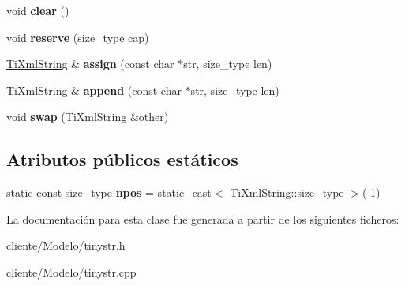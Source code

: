 \begin{DoxyCompactItemize}
\item 
\hypertarget{classTiXmlString_ab20e06e4c666abf3bdbfb3a1191d4888}{void {\bfseries clear} ()}\label{classTiXmlString_ab20e06e4c666abf3bdbfb3a1191d4888}

\item 
\hypertarget{classTiXmlString_a88ecf9f0f00cb5c67b6b637958d7049c}{void {\bfseries reserve} (size\-\_\-type cap)}\label{classTiXmlString_a88ecf9f0f00cb5c67b6b637958d7049c}

\item 
\hypertarget{classTiXmlString_ac72f3d9149b7812c1e6c59402014d0d5}{\hyperlink{classTiXmlString}{\-Ti\-Xml\-String} \& {\bfseries assign} (const char $\ast$str, size\-\_\-type len)}\label{classTiXmlString_ac72f3d9149b7812c1e6c59402014d0d5}

\item 
\hypertarget{classTiXmlString_ad44b21700d2ec24a511367b222b643fb}{\hyperlink{classTiXmlString}{\-Ti\-Xml\-String} \& {\bfseries append} (const char $\ast$str, size\-\_\-type len)}\label{classTiXmlString_ad44b21700d2ec24a511367b222b643fb}

\item 
\hypertarget{classTiXmlString_aa392cbc180752a79f007f4f9280c7762}{void {\bfseries swap} (\hyperlink{classTiXmlString}{\-Ti\-Xml\-String} \&other)}\label{classTiXmlString_aa392cbc180752a79f007f4f9280c7762}

\end{DoxyCompactItemize}
\subsection*{\-Atributos públicos estáticos}
\begin{DoxyCompactItemize}
\item 
\hypertarget{classTiXmlString_a8f4422d227088dc7bec96f479b275d0a}{static const size\-\_\-type {\bfseries npos} = static\-\_\-cast$<$ \-Ti\-Xml\-String\-::size\-\_\-type $>$(-\/1)}\label{classTiXmlString_a8f4422d227088dc7bec96f479b275d0a}

\end{DoxyCompactItemize}


\-La documentación para esta clase fue generada a partir de los siguientes ficheros\-:\begin{DoxyCompactItemize}
\item 
cliente/\-Modelo/tinystr.\-h\item 
cliente/\-Modelo/tinystr.\-cpp\end{DoxyCompactItemize}
